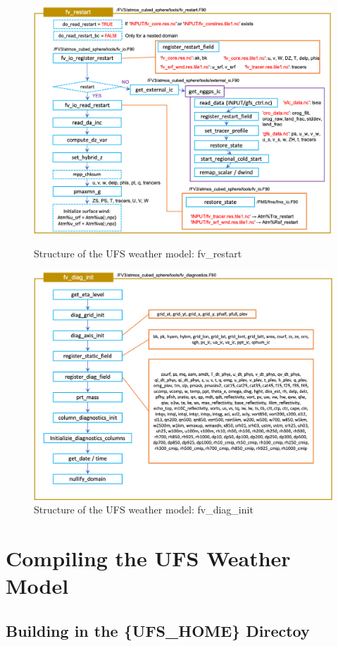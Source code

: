 \documentclass[11pt,fleqn]{report}              %
\begin{document}
\begin{figure}[ht!]
  \centering
  \includegraphics[width=0.73\linewidth]{fv3_struct_fvrestart.png}
  \caption{Structure of the UFS weather model: fv\_restart}
  \label{fig:fv_struct_fvrestart}

\vspace{0.1cm}

  \includegraphics[width=0.73\linewidth]{fv3_struct_fvdiaginit.png}
  \caption{Structure of  the UFS weather model: fv\_diag\_init}
  \label{fig:fv_struct_fvdiaginit}
\end{figure}





\section{Compiling the UFS Weather Model}
\label{sec:build_ufs_weather_model}

\subsection{Building in the \{UFS\_HOME\} Directoy}
\end{document}
